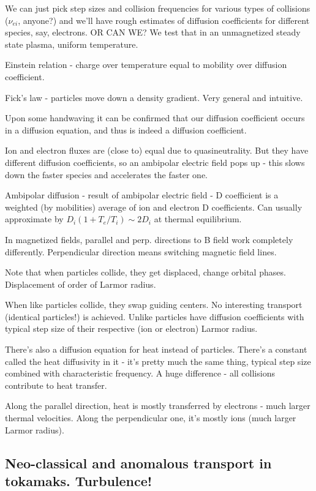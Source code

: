 \documentclass[PlasmaNotes.tex]{subfiles}
\begin{document}
  We can just pick step sizes and collision frequencies for various types of collisions ($\nu_{ei}$, anyone?) and we'll have rough estimates of diffusion coefficients for different species, say, electrons. OR CAN WE? We test that in an unmagnetized steady state plasma, uniform temperature. 
  
  Einstein relation - charge over temperature equal to mobility over diffusion coefficient.
  
  Fick's law - particles move down a density gradient. Very general and intuitive.
  
  Upon some handwaving it can be confirmed that our diffusion coefficient occurs in a diffusion equation, and thus is indeed a diffusion coefficient.
  
  Ion and electron fluxes are (close to) equal due to quasineutrality. But they have different diffusion coefficients, so an ambipolar electric field pops up - this slows down the faster species and accelerates the faster one.
  
  Ambipolar diffusion - result of ambipolar electric field - D coefficient is a weighted (by mobilities) average of ion and electron D coefficients. Can usually approximate by $D_i (1+T_e/T_i) \sim 2 D_i$ at thermal equilibrium.
  
  In magnetized fields, parallel and perp. directions to B field work completely differently. Perpendicular direction means switching magnetic field lines.
  
  Note that when particles collide, they get displaced, change orbital phases. Displacement of order of Larmor radius.
  
  When like particles collide, they swap guiding centers. No interesting transport (identical particles!) is achieved. Unlike particles have diffusion coefficients with typical step size of their respective (ion or electron) Larmor radius.
  
  There's also a diffusion equation for heat instead of particles. There's a constant called the heat diffusivity in it - it's pretty much the same thing, typical step size combined with characteristic frequency. A huge difference - all collisions contribute to heat transfer.
  
  Along the parallel direction, heat is mostly transferred by electrons - much larger thermal velocities. Along the perpendicular one, it's mostly ions (much larger Larmor radius).

\subsection{Neo-classical and anomalous transport in tokamaks. Turbulence!}
\end{document}
